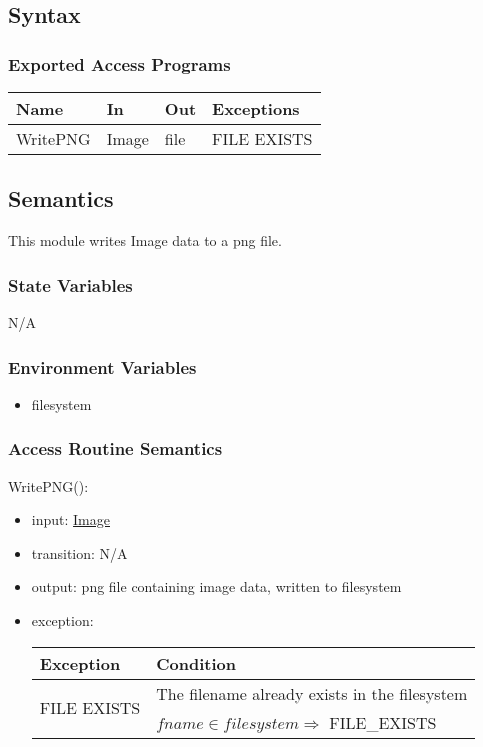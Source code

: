 \documentclass[12pt, titlepage]{article}
\begin{document}
\subsection{Syntax}

\subsubsection{Exported Access Programs}

\begin{center}
    \begin{tabular}{p{2cm} p{4cm} p{4cm} p{4cm}}
        \hline
        \textbf{Name} & \textbf{In} & \textbf{Out} & \textbf{Exceptions} \\
        \hline
        WritePNG & Image & file & FILE EXISTS \\
        \hline
    \end{tabular}
\end{center}

\subsection{Semantics}
This module writes Image data to a png file.

\subsubsection{State Variables}
N/A

\subsubsection{Environment Variables}
\begin{itemize}
    \item filesystem
\end{itemize}

\subsubsection{Access Routine Semantics}

\noindent WritePNG():
\begin{itemize}
    \item input: \hyperref[Mod:Image]{Image}
    \item transition: N/A
    \item output: png file containing image data, written to filesystem
    \item exception:
    \begin{center}
        \begin{tabular}{p{3cm} p{12cm}}
            \toprule[0.15em]
            \textbf{Exception} & \textbf{Condition}\\
            \midrule[0.1em]
            \multirow{2}{0.25\textwidth}{FILE EXISTS} & The filename already
            exists in the filesystem\\ 
            & $fname \in filesystem \Rightarrow$ FILE\_EXISTS\\ 
            \bottomrule[0.15em]
        \end{tabular}
    \end{center}
\end{itemize}
\end{document}
